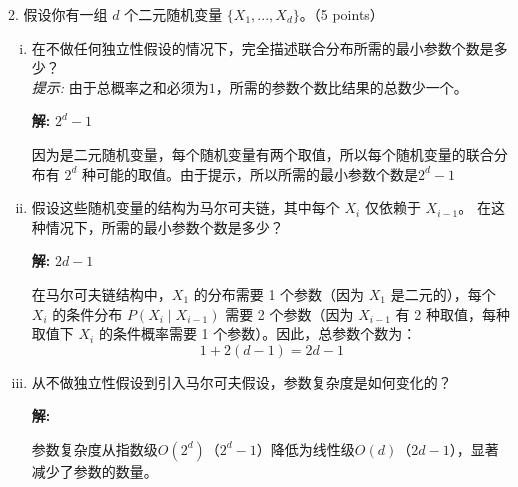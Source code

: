 \documentclass[8pt]{article}
\begin{document}
\vspace{3em}

2. 假设你有一组 $d$ 个二元随机变量 $\{X_1, ..., X_d\}$。（5 points）
\begin{enumerate}[(i)]
        \item 
        在不做任何独立性假设的情况下，完全描述联合分布所需的最小参数个数是多少？ \\
        \textit{提示:} 由于总概率之和必须为$1$，所需的参数个数比结果的总数少一个。
        
        \textbf{\large 解:} $2^d - 1$

        因为是二元随机变量，每个随机变量有两个取值，所以每个随机变量的联合分布有 $2^d$ 种可能的取值。由于提示，所以所需的最小参数个数是$2^d - 1$
        \vspace{1em}

        \item 
       假设这些随机变量的结构为马尔可夫链，其中每个 $X_i$ 仅依赖于 $X_{i-1}$。 在这种情况下，所需的最小参数个数是多少？
        
        \textbf{\large 解:} $2d - 1$

        在马尔可夫链结构中，$X_1$ 的分布需要 1 个参数（因为 $X_1$ 是二元的），每个 $X_i$ 的条件分布 $P(X_i \mid X_{i-1})$ 需要 2 个参数（因为 $X_{i-1}$ 有 2 种取值，每种取值下 $X_i$ 的条件概率需要 1 个参数）。因此，总参数个数为：
        \[
        1 + 2(d-1) = 2d - 1
        \]
        \vspace{1em}


        \item 
        从不做独立性假设到引入马尔可夫假设，参数复杂度是如何变化的？
        
        \textbf{\large 解:}

        参数复杂度从指数级$O(2^d)$（$2^d - 1$）降低为线性级$O(d)$（$2d - 1$），显著减少了参数的数量。
        \vspace{1em}
    \end{enumerate}
\vspace{3em}
\end{document}
